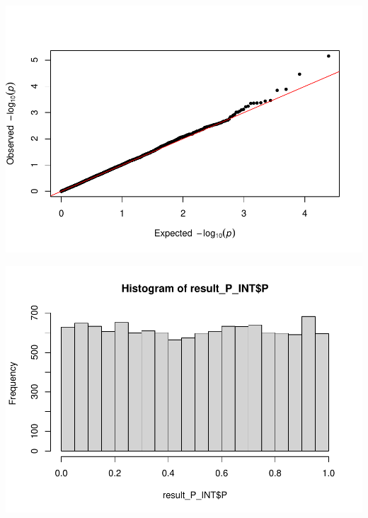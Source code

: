 \documentclass[
]{article}
\newenvironment{Shaded}{\begin{snugshade}}{\end{snugshade}}
\newcommand{\CommentTok}[1]{\textcolor[rgb]{0.56,0.35,0.01}{\textit{#1}}}
\newcommand{\DataTypeTok}[1]{\textcolor[rgb]{0.13,0.29,0.53}{#1}}
\newcommand{\DecValTok}[1]{\textcolor[rgb]{0.00,0.00,0.81}{#1}}
\newcommand{\KeywordTok}[1]{\textcolor[rgb]{0.13,0.29,0.53}{\textbf{#1}}}
\newcommand{\NormalTok}[1]{#1}
\newcommand{\OperatorTok}[1]{\textcolor[rgb]{0.81,0.36,0.00}{\textbf{#1}}}
\newcommand{\StringTok}[1]{\textcolor[rgb]{0.31,0.60,0.02}{#1}}
\begin{document}
\includegraphics{stats-gene-research-progress-v7_files/figure-latex/Simulation_several_genes-2.pdf}

\begin{Shaded}
\end{Shaded}

\includegraphics{stats-gene-research-progress-v7_files/figure-latex/Simulation_several_genes-3.pdf}

\begin{Shaded}
\end{Shaded}
\end{document}
